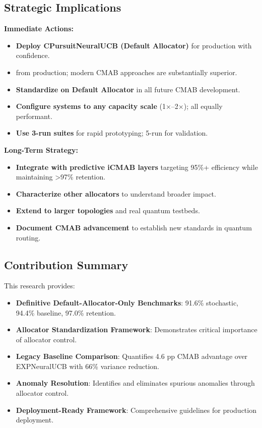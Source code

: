 \documentclass[12pt,a4paper]{article}
\newcommand{\success}[1]{\textcolor{accentgreen}{\textbf{#1}}}
\begin{document}
\subsection{Strategic Implications}

\textbf{Immediate Actions:}
\begin{itemize}
    \item \success{Deploy CPursuitNeuralUCB (Default Allocator)} for production with confidence.
    \item {} from production; modern CMAB approaches are substantially superior.
    \item \success{Standardize on Default Allocator} in all future CMAB development.
    \item \success{Configure systems to any capacity scale} (1$\times$--2$\times$); all equally performant.
    \item \success{Use 3-run suites} for rapid prototyping; 5-run for validation.
\end{itemize}

\textbf{Long-Term Strategy:}
\begin{itemize}
    \item \success{Integrate with predictive iCMAB layers} targeting 95\%+ efficiency while maintaining >97\% retention.
    \item \success{Characterize other allocators} to understand broader impact.
    \item \success{Extend to larger topologies} and real quantum testbeds.
    \item \success{Document CMAB advancement} to establish new standards in quantum routing.
\end{itemize}

\subsection{Contribution Summary}

This research provides:

\begin{itemize}
    \item \success{\textbf{Definitive Default-Allocator-Only Benchmarks}}: 91.6\% stochastic, 94.4\% baseline, 97.0\% retention.
    
    \item \success{\textbf{Allocator Standardization Framework}}: Demonstrates critical importance of allocator control.
    
    \item \success{\textbf{Legacy Baseline Comparison}}: Quantifies 4.6 pp CMAB advantage over EXPNeuralUCB with 66\% variance reduction.
    
    \item \success{\textbf{Anomaly Resolution}}: Identifies and eliminates spurious anomalies through allocator control.
    
    \item \success{\textbf{Deployment-Ready Framework}}: Comprehensive guidelines for production deployment.
\end{itemize}
\end{document}
